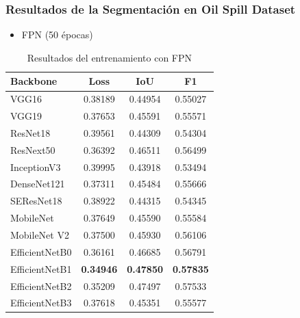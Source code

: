 \begin{frame}
\frametitle{Resultados de la Segmentación en Oil Spill Dataset}
\begin{itemize}
    \item FPN (50 épocas)
\end{itemize}
    \begin{table}[]
        \centering
        \small
        \begin{tabular}{l|c|c|c}
            \hline
            Backbone        & Loss    & IoU     & F1 \\
            \hline
            VGG16           & 0.38189 & 0.44954 & 0.55027 \\
            VGG19           & 0.37653 & 0.45591 & 0.55571 \\
            ResNet18        & 0.39561 & 0.44309 & 0.54304 \\
            ResNext50       & 0.36392 & 0.46511 & 0.56499 \\ 
            InceptionV3     & 0.39995 & 0.43918 & 0.53494 \\
            DenseNet121     & 0.37311 & 0.45484 & 0.55666 \\
            SEResNet18      & 0.38922 & 0.44315 & 0.54345 \\
            MobileNet       & 0.37649 & 0.45590 & 0.55584 \\ 
            MobileNet V2    & 0.37500 & 0.45930 & 0.56106 \\
            EfficientNetB0  & 0.36161 & 0.46685 & 0.56791 \\
            EfficientNetB1  & \textbf{0.34946} & \textbf{0.47850} & \textbf{0.57835} \\
            EfficientNetB2  & 0.35209 & 0.47497 & 0.57533 \\
            EfficientNetB3  & 0.37618 & 0.45351 & 0.55577 \\
            \hline
        \end{tabular}
        \caption{Resultados del entrenamiento con FPN}
        \label{tab:my_label}
    \end{table}
\end{frame}

